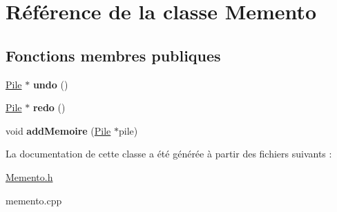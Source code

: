 \hypertarget{class_memento}{\section{Référence de la classe Memento}
\label{class_memento}
}
\subsection*{Fonctions membres publiques}
\begin{DoxyCompactItemize}
\item 
\hypertarget{class_memento_a2db6a70bed1bedc3f5d93f8fa7d3a512}{\hyperlink{class_pile}{Pile} $\ast$ {\bfseries undo} ()}\label{class_memento_a2db6a70bed1bedc3f5d93f8fa7d3a512}

\item 
\hypertarget{class_memento_ab495f44281bd0060db9d8fe94306e99a}{\hyperlink{class_pile}{Pile} $\ast$ {\bfseries redo} ()}\label{class_memento_ab495f44281bd0060db9d8fe94306e99a}

\item 
\hypertarget{class_memento_a2e4928528bc1f886696ed5fb2524542a}{void {\bfseries add\-Memoire} (\hyperlink{class_pile}{Pile} $\ast$pile)}\label{class_memento_a2e4928528bc1f886696ed5fb2524542a}

\end{DoxyCompactItemize}


La documentation de cette classe a été générée à partir des fichiers suivants \-:\begin{DoxyCompactItemize}
\item 
\hyperlink{_memento_8h}{Memento.\-h}\item 
memento.\-cpp\end{DoxyCompactItemize}
